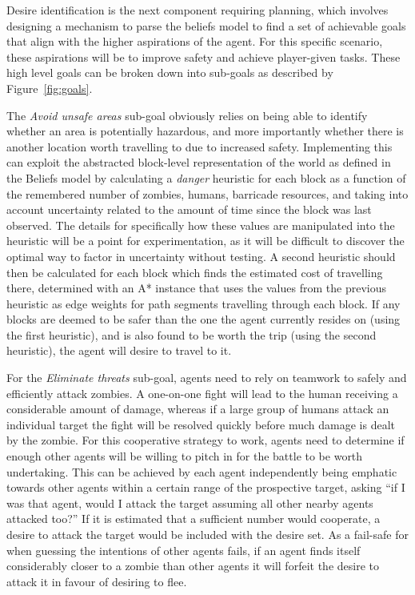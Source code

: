 \documentclass[12pt,a4paper]{article}
\begin{document}
Desire identification is the next component requiring planning, which involves designing a mechanism to parse the beliefs model to find a set of achievable goals that align with the higher aspirations of the agent. For this specific scenario, these aspirations will be to improve safety and achieve player-given tasks. These high level goals can be broken down into sub-goals as described by Figure~\ref{fig:goals}.

The \emph{Avoid unsafe areas} sub-goal obviously relies on being able to identify whether an area is potentially hazardous, and more importantly whether there is another location worth travelling to due to increased safety. Implementing this can exploit the abstracted block-level representation of the world as defined in the Beliefs model by calculating a \emph{danger} heuristic for each block as a function of the remembered number of zombies, humans, barricade resources, and taking into account uncertainty related to the amount of time since the block was last observed. The details for specifically how these values are manipulated into the heuristic will be a point for experimentation, as it will be difficult to discover the optimal way to factor in uncertainty without testing. A second heuristic should then be calculated for each block which finds the estimated cost of travelling there, determined with an A* instance that uses the values from the previous heuristic as edge weights for path segments travelling through each block. If any blocks are deemed to be safer than the one the agent currently resides on (using the first heuristic), and is also found to be worth the trip (using the second heuristic), the agent will desire to travel to it.

For the \emph{Eliminate threats} sub-goal, agents need to rely on teamwork to safely and efficiently attack zombies. A one-on-one fight will lead to the human receiving a considerable amount of damage, whereas if a large group of humans attack an individual target the fight will be resolved quickly before much damage is dealt by the zombie. For this cooperative strategy to work, agents need to determine if enough other agents will be willing to pitch in for the battle to be worth undertaking. This can be achieved by each agent independently being emphatic towards other agents within a certain range of the prospective target, asking ``if I was that agent, would I attack the target assuming all other nearby agents attacked too?'' If it is estimated that a sufficient number would cooperate, a desire to attack the target would be included with the desire set. As a fail-safe for when guessing the intentions of other agents fails, if an agent finds itself considerably closer to a zombie than other agents it will forfeit the desire to attack it in favour of desiring to flee.
\end{document}
